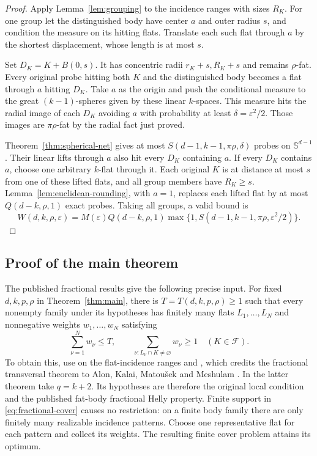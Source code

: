 \documentclass[11pt]{article}
\theoremstyle{remark}
\newcommand{\Sph}{\mathbb S}
\newcommand{\eps}{\varepsilon}
\begin{document}
\begin{proof}
Apply Lemma~\ref{lem:grouping} to the incidence ranges with sizes \(R_K\).
For one group let the distinguished body have center \(a\) and
outer radius \(s\), and condition the measure on its hitting flats.
Translate each such flat through \(a\) by the shortest displacement,
whose length is at most \(s\).

Set \(D_K=K+B(0,s)\). It has concentric radii \(r_K+s,R_K+s\)
and remains \(\rho\)-fat.
Every original probe hitting both \(K\) and the distinguished body
becomes a flat through \(a\) hitting \(D_K\).
Take \(a\) as the origin and push the conditional measure to the
great \((k-1)\)-spheres given by these linear \(k\)-spaces.
This measure hits the radial image of each \(D_K\) avoiding \(a\)
with probability at least \(\delta=\eps^2/2\).
Those images are \(\pi\rho\)-fat by the radial fact just proved.

Theorem~\ref{thm:spherical-net} gives at most
\(S(d-1,k-1,\pi\rho,\delta)\) probes on \(\Sph^{d-1}\).
Their linear lifts through \(a\) also hit every \(D_K\) containing \(a\).
If every \(D_K\) contains \(a\), choose one arbitrary \(k\)-flat through it.
Each original \(K\) is at distance at most \(s\) from one of these
lifted flats, and all group members have \(R_K\geq s\).
Lemma~\ref{lem:euclidean-rounding}, with \(a=1\), replaces each lifted
flat by at most \(Q(d-k,\rho,1)\) exact probes.
Taking all groups, a valid bound is
\begin{equation}
 W(d,k,\rho,\eps)=M(\eps)Q(d-k,\rho,1)
 \max\{1,S(d-1,k-1,\pi\rho,\eps^2/2)\}.
 \label{eq:W}
\end{equation}
\end{proof}

\subsection{Proof of the main theorem}

The published fractional results give the following precise input.
For fixed \(d,k,p,\rho\) in Theorem~\ref{thm:main}, there is
\(T=T(d,k,p,\rho)\geq1\) such that every nonempty family under its
hypotheses has finitely many flats \(L_1,\ldots,L_N\) and nonnegative
weights \(w_1,\ldots,w_N\) satisfying
\begin{equation}
 \sum_{\nu=1}^N w_\nu\leq T,\qquad
 \sum_{\nu:L_\nu\cap K\ne\varnothing}w_\nu\geq1
 \quad(K\in\mathcal F).
 \label{eq:fractional-cover}
\end{equation}
To obtain this, use \cite[Theorem~5]{JP} on the flat-incidence ranges and
\cite[Theorem~22]{JP}, which credits the fractional transversal theorem
to Alon, Kalai, Matou\v{s}ek and Meshulam \cite{AKMM}.
In the latter theorem take \(q=k+2\). Its hypotheses are therefore the
original local condition and the published fat-body fractional Helly
property.
Finite support in \eqref{eq:fractional-cover} causes no restriction:
on a finite body family there are only finitely many realizable
incidence patterns. Choose one representative flat for each pattern
and collect its weights. The resulting finite cover problem attains
its optimum.
\end{document}
